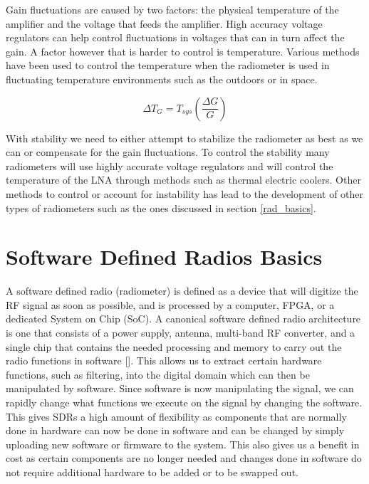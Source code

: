 Gain fluctuations are caused by two factors: the physical temperature of the amplifier and the voltage that feeds the amplifier.  High accuracy voltage regulators can help control fluctuations in voltages that can in turn affect the gain.  A factor however that is harder to control is temperature.  Various methods have been used to control the temperature when the radiometer is used in fluctuating temperature environments such as the outdoors or in space.  

\begin{equation} \label{eq:rad_stability}
\Delta T_G=T_{sys} \left(\frac{\Delta G}{G}\right)
\end{equation}

With stability we need to either attempt to stabilize the radiometer as best as we can or compensate for the gain fluctuations.  To control the stability many radiometers will use highly accurate voltage regulators and will control the temperature of the LNA through methods such as thermal electric coolers.  Other methods to control or account for instability has lead to the development of other types of radiometers such as the ones discussed in section \ref{rad_basics}.

 
\section{Software Defined Radios Basics} 
A software defined radio (radiometer) is defined as a device that will digitize the RF signal as soon as possible,  and is processed by a computer, FPGA, or a dedicated System on Chip (SoC).  A canonical software defined radio architecture is one that consists of a power supply, antenna, multi-band RF converter, and a single chip that contains the needed processing and memory to carry out the radio functions in software [\cite{Mitola1995}]. This allows us to extract certain hardware functions, such as filtering, into the digital domain which can then be manipulated by software.  Since software is now manipulating the signal, we can rapidly change what functions we execute on the signal by changing the software.  This gives SDRs a high amount of flexibility as components that are normally done in hardware can now be done in software and can be changed by simply uploading new software or firmware to the system.  This also gives us a benefit in cost as certain components are no longer needed and changes done in software do not require additional hardware to be added or to be swapped out.

